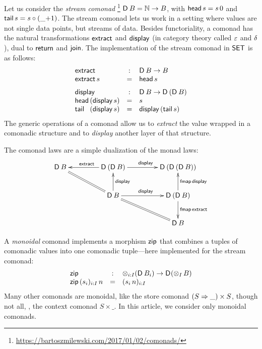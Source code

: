 \documentclass[acmsmall,review,anonymous]{acmart}\settopmatter{printfolios=true,printccs=false,printacmref=false}
\theoremstyle{remark}
\begin{document}
Let us consider the \emph{stream comonad}%
\footnote{\url{https://bartoszmilewski.com/2017/01/02/comonads/}}
$\mathsf{D}_{}\,B = \mathbb{N} \to B$,
with $\mathsf{head}\,s = s\,0$ and $\mathsf{tail}\,s = s \circ (\_{+}1)$.
The stream comonad lets us work in a setting where values are not
single data points, but streams of data.
Besides functoriality, a
comonad has the natural transformations $\mathsf{extract}$ and $\mathsf{display}_{}$
(in category theory called $\varepsilon$ and $\delta$),
dual to $\mathsf{return}$ and $\mathsf{join}$.  The implementation of the stream
comonad in $\mathsf{SET}$ is as follows:
\[
\begin{array}{lcl}
  \textract & : & \D\,B \to B \\
  \textract\,s & = & \thead\,s
\\[1.5ex]
  \tdisplay & : & \D\,B \to \D\,(\D\,B) \\
  \thead\,(\tdisplay\,s) & = & s \\
  \makebox[0pt][l]{\ttail}\phantom{\thead}\,(\tdisplay\,s) & = & \tdisplay\,(\ttail\,s) \\
\end{array}
\]
The generic operations of a comonad allow us to \emph{extract} the
value wrapped in a comonadic structure and to \emph{display} another
layer of that structure.

The comonad laws are a simple dualization of the monad laws:
\[
\xymatrix@C=10ex{
\D\,B  \ar@{=}[dr]
  & \D\,(\D\,B) \ar[l]_{\textract} \ar[r]^{\tdisplay}
  & \D\,(\D\,(\D\,B))
\\
  & \D\,B \ar[u]_{\tdisplay} \ar[r]^{\tdisplay} \ar@{=}[dr]
  & \D\,(\D\,B) \ar[u]_{\tfmap\,\tdisplay} \ar[d]^{\tfmap\,\textract}
\\
  &
  & \D\,B
}
\]

A \emph{monoidal} comonad implements a morphism $\mathsf{zip}$ that combines
a tuples of comonadic values into one comonadic tuple---here
implemented for the stream comonad:
\[
\begin{array}{lcl}
  \mathsf{zip} & : & \mathop\otimes_{i:I} (\mathsf{D}_{}\,B_i) \to \mathsf{D}_{}(\mathop\otimes_{I} B) \\
  \mathsf{zip}\,(s_i)_{i:I}\,n & = & (s_i\,n)_{i:I} \\
\end{array}
\]
Many other comonads are monoidal,
like the store comonad $(S \Rightarrow \_) \times S$,
though not all, \eg, the context comonad $S \times \_$.
In this article, we consider only monoidal comonads.
\end{document}
